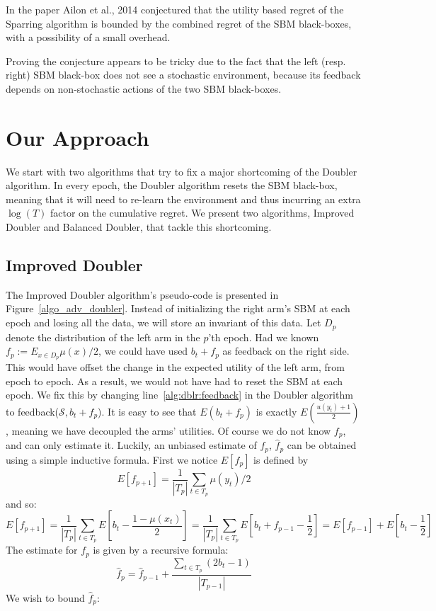 \documentclass{llncs}
\begin{document}
	\begin{conjecture}
 		In the paper Ailon et al., 2014 conjectured that the utility based regret of the Sparring algorithm is bounded by the combined regret of the SBM black-boxes, with a possibility of a small overhead.
 	\end{conjecture}	
 	Proving the conjecture appears to be tricky due to the fact
that the left (resp. right) SBM black-box does not see a stochastic environment, because its feedback depends on non-stochastic actions of the two SBM black-boxes. 
	
\section{Our Approach}	
	We start with two algorithms that try to fix a major shortcoming of the Doubler algorithm. In every epoch, the Doubler algorithm resets the SBM black-box, meaning that it will need to re-learn the environment and thus incurring an extra $\log(T)$ factor on the cumulative regret.
	We present two algorithms, Improved Doubler and Balanced Doubler, that tackle this shortcoming.
	
	\subsection{Improved Doubler}
	The Improved Doubler algorithm's pseudo-code is presented in Figure~\ref{algo_adv_doubler}.
	Instead of initializing the right arm’s SBM at each epoch and losing all the data, we will store an invariant of this data.
	Let $D_p$ denote the distribution of the left arm in the $p$’th epoch. 
	Had we known $f_p := E_{x\in D_p} \mu(x)/2$, we could have used $b_t + f_p$ as feedback on the right side.
	This would have offset the change in the expected utility of the left arm, from epoch to epoch.
	As a result, we would not have had to reset the SBM at each epoch.
	We fix this by changing line~\ref{alg:dblr:feedback} in the Doubler algorithm to feedback($\mathcal{S}, b_t + f_p $).
	It is easy to see that $E(b_t + f_p )$ is exactly $E(\frac{u(y_t)+1}{2})$, meaning we have decoupled the arms' utilities.
	Of course we do not know $f_p$, and can only estimate it.
	Luckily, an unbiased estimate of $f_p$, $\hat{f}_p$ can be obtained using a simple inductive formula.
	First we notice $E[f_p]$ is defined by 
	\begin{equation}
	E[f_{p+1}] = \frac{1}{|T_p|}\sum\limits_{t\in T_p} \mu(y_t)/2
	\end{equation}
	and so:
	$$
	E[f_{p+1} ]= 
		\frac{1}{|T_p|}\sum\limits_{t\in T_p} E[b_t - \frac{1-\mu(x_t)}{2}] = \frac{1}{|T_p|}\sum\limits_{t\in T_p} E[b_t + f_{p-1}-\frac{1}{2}] = E[f_{p-1} ]+E[b_t -\frac{1}{2}]
	$$
	The estimate for $f_p$ is given by a recursive formula:
	\begin{equation}
	\hat{f}_p=\hat{f}_{p-1} + \frac{\sum\limits_{t\in T_p} (2b_t -1)}{|T_{p-1}|}
	\end{equation}
	We wish to bound $\hat{f}_p$:
	
\end{document}
